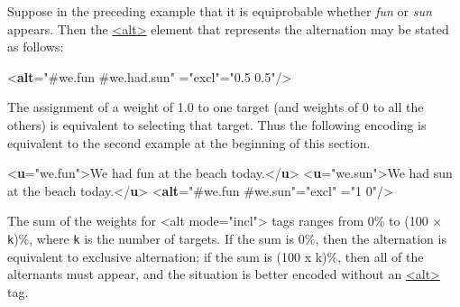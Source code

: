 Suppose in the preceding example that it is equiprobable whether \textit{fun} or \textit{sun} appears. Then the \hyperref[TEI.alt]{<alt>} element that represents the alternation may be stated as follows: \par\bgroup{}\exampleFont \begin{shaded}\noindent\mbox{}{<\textbf{alt}\hspace*{1em}{target}="{\#we.fun \#we.had.sun}"\mbox{}\newline 
\hspace*{1em}{mode}="{excl}"\hspace*{1em}{weights}="{0.5 0.5}"/>}\end{shaded}\egroup\par \par
The assignment of a weight of 1.0 to one target (and weights of 0 to all the others) is equivalent to selecting that target. Thus the following encoding is equivalent to the second example at the beginning of this section. \par\bgroup{}\exampleFont \begin{shaded}\noindent\mbox{}{<\textbf{u}\hspace*{1em}{xml:id}="{we.fun}">}We had fun at the beach today.{</\textbf{u}>}\mbox{}\newline 
{<\textbf{u}\hspace*{1em}{xml:id}="{we.sun}">}We had sun at the beach today.{</\textbf{u}>}\mbox{}\newline 
{<\textbf{alt}\hspace*{1em}{target}="{\#we.fun \#we.sun}"\hspace*{1em}{mode}="{excl}"\mbox{}\newline 
\hspace*{1em}{weights}="{1 0}"/>}\end{shaded}\egroup\par \noindent                                          The sum of the weights for <alt mode="incl"> tags ranges from 0\% to (100 × \texttt{k})\%, where \texttt{k} is the number of targets. If the sum is 0\%, then the alternation is equivalent to exclusive alternation; if the sum is (100 x k)\%, then all of the alternants must appear, and the situation is better encoded without an \hyperref[TEI.alt]{<alt>} tag.\par

